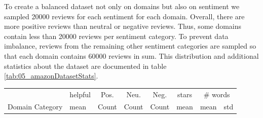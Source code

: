 To create a balanced dataset not only on domains but also on sentiment we sampled 20000 reviews for each sentiment for each domain. Overall, there are more positive reviews than neutral or negative reviews. Thus, some domains contain less than 20000 reviews per sentiment category. To prevent data imbalance, reviews from the remaining other sentiment categories are sampled so that each domain contains 60000 reviews in sum. This distribution and additional statistics about the dataset are documented in table \ref{tab:05_amazonDatasetStats}.
\begin{table}	
	\begin{tabularx}{\textwidth}{lXrrrcrr}
		
		\toprule
		{} & helpful & \multicolumn{1}{c}{Pos.} & \multicolumn{1}{c}{Neu.} & \multicolumn{1}{c}{Neg.} &\multicolumn{1}{c}{stars} & \multicolumn{2}{c}{\# words} \\
		Domain Category &         					mean &   	Count & Count & Count &  mean 	&  mean  &     std \\


\end{tabularx}
\end{table}
